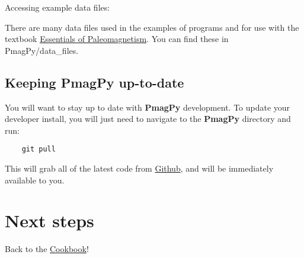 \documentclass[11pt]{article}
\begin{document}
Accessing example data files:

   There are many data files used in the examples of programs and for use with the textbook  \href{http://earthref.org/MAGIC/books/Tauxe/Essentials/WebBook3.html}{Essentials of Paleomagnetism}.  You can find these in PmagPy/data\_files.


\subsection{Keeping PmagPy up-to-date}


    You will want to stay up to date with {\bf PmagPy} development.  To update your developer install, you will just need to navigate to the {\bf PmagPy} directory and run:

\begin{verbatim}
    git pull
\end{verbatim}

This will grab all of the latest code from \href{https://github.com/PmagPy/PmagPy}{Github}, and will be immediately available to you.

\section{Next steps}

Back to the \href{https://earthref.org/PmagPy/cookbook/#next_steps}{Cookbook}!
\end{document}
